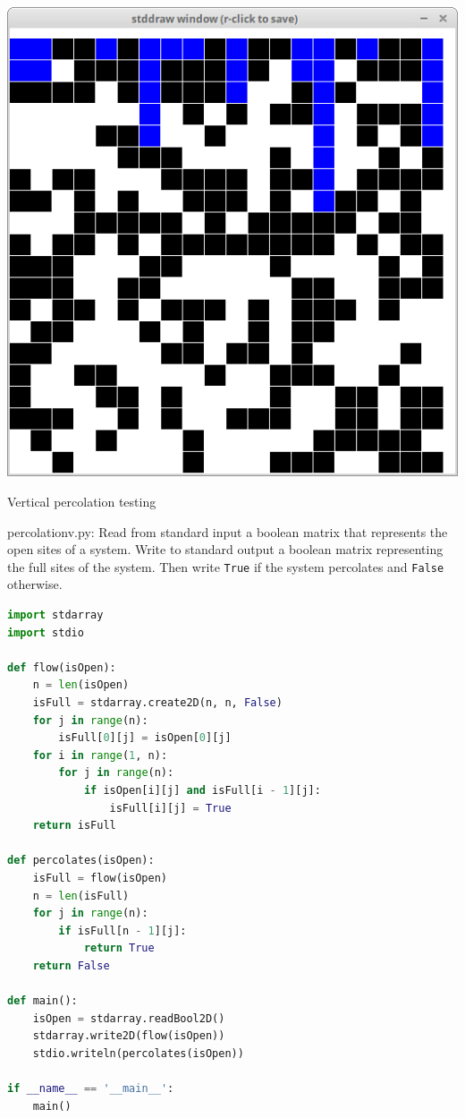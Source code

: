 \documentclass[8pt,a4paper,compress,handout]{beamer}
\begin{document}
\begin{frame}[fragile]
\begin{center}
\includegraphics[scale=0.4]{figures/percolation6.png}

\smallskip

\tiny Vertical percolation testing
\end{center}
\end{frame}

\begin{frame}[fragile]
\begin{framed}
\tiny percolationv.py: Read from standard input a boolean matrix that represents the open sites of a system. Write to standard output a boolean matrix representing the full sites of the system. Then write \lstinline{True} if the system percolates and \lstinline{False} otherwise.
\end{framed}

\begin{lstlisting}[language=Python]
import stdarray
import stdio

def flow(isOpen):
    n = len(isOpen)
    isFull = stdarray.create2D(n, n, False)
    for j in range(n):
        isFull[0][j] = isOpen[0][j]
    for i in range(1, n):
        for j in range(n):
            if isOpen[i][j] and isFull[i - 1][j]:
                isFull[i][j] = True
    return isFull

def percolates(isOpen):
    isFull = flow(isOpen)
    n = len(isFull)
    for j in range(n):
        if isFull[n - 1][j]:
            return True
    return False

def main():
    isOpen = stdarray.readBool2D()
    stdarray.write2D(flow(isOpen))
    stdio.writeln(percolates(isOpen))
    
if __name__ == '__main__':
    main()
\end{lstlisting}
\end{frame}
\end{document}
